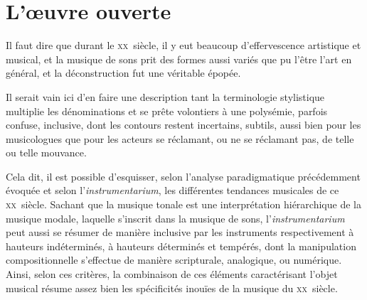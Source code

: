 \documentclass{article}
\begin{document}
\section{L'œuvre ouverte}

Il faut dire que durant le \textsc{xx}\ieme ~siècle, il y eut beaucoup d'effervescence artistique et musical, et la musique de sons prit des formes aussi variés que pu l'être l'art en général, et la déconstruction fut une véritable épopée.

Il serait vain ici d'en faire une description %
tant la terminologie stylistique  multiplie les dénominations et se prête volontiers à une polysémie, parfois confuse, inclusive, dont les contours restent incertains, subtils, aussi bien pour les musicologues que pour les acteurs se réclamant, ou ne se réclamant pas, de telle ou telle mouvance.

Cela dit, il est possible d'esquisser, selon l'analyse paradigmatique précédemment évoquée et selon l'\textit{instrumentarium}, les différentes tendances musicales de ce \textsc{xx}\ieme ~siècle.
 Sachant que la musique tonale est une interprétation hiérarchique de la musique modale, laquelle s'inscrit dans la musique de sons, l'\textit{instrumentarium} peut aussi se résumer de manière inclusive par les instruments respectivement  %
 à hauteurs indéterminés, à hauteurs déterminés et tempérés, dont la manipulation compositionnelle s'effectue de manière scripturale, analogique, ou numérique. 
 Ainsi, selon ces critères, la combinaison de ces éléments caractérisant l'objet musical résume assez bien les spécificités inouïes de la musique du \textsc{xx}\ieme ~siècle. 
 
\end{document}
